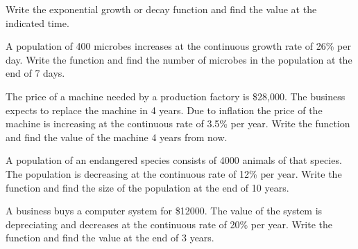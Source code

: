 Write the exponential growth or decay function and find the value at the indicated time.

\begin{puzzle} A population of 400 microbes increases at the continuous growth rate of 26\% per day. Write the function and find the number of microbes in the population at the end of 7 days.
\end{puzzle}

\begin{puzzle} The price of a machine needed by a production factory is \$28,000. The business expects to replace the machine in 4 years. Due to inflation the price of the machine is increasing at the continuous rate of 3.5\% per year. Write the function and find the value of the machine 4 years from now.
\end{puzzle}

\begin{puzzle} A population of an endangered species consists of 4000 animals of that species. The population is decreasing at the continuous rate of 12\% per year. Write the function and find the size of the population at the end of 10 years.
\end{puzzle}

\begin{puzzle} A business buys a computer system for \$12000. The value of the system is depreciating and decreases at the continuous rate of 20\% per year. Write the function and find the value at the end of 3 years.
\end{puzzle}
